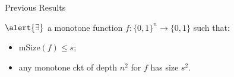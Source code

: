 \begin{frame}{Previous Results}

    \begin{theorem}
        $\alert{\exists}$ a monotone function $f\colon \{0, 1\}^{n} \to \{0, 1\}$ such that:
        \begin{itemize}
            \item $\mathrm{mSize}(f) \le s$;
            \item any monotone ckt of depth $n^2$ for $f$ has size $s^2$.
        \end{itemize}
    \end{theorem}
\end{frame}